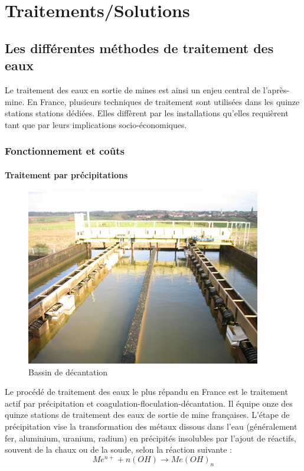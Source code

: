 \documentclass{article}
\begin{document}
\newpage
\section{Traitements/Solutions}
\subsection{Les différentes méthodes de traitement des eaux}
Le traitement des eaux en sortie de mines est ainsi un enjeu central de l’après-mine. En France, plusieurs techniques de traitement sont utilisées dans les quinze stations stations dédiées. Elles diffèrent par les installations qu’elles requièrent tant que par leurs implications socio-économiques.

\subsubsection{Fonctionnement et coûts}
\paragraph{Traitement par précipitations} \hspace{1 em}




\begin{figure}[H]
\centering
\includegraphics[width = 0.5\linewidth]{III_A_1.png}
\caption{Bassin de décantation}
\label{fig:bassin_decantation}
\end{figure}



Le procédé de traitement des eaux le plus répandu en France est le traitement actif par précipitation et coagulation-floculation-décantation. Il équipe onze des quinze stations de traitement des eaux de sortie de mine françaises. 
L’étape de précipitation vise la transformation des métaux dissous dans l’eau (généralement fer, aluminium, uranium, radium) en précipités insolubles par l’ajout de réactifs, souvent de la chaux ou de la soude, selon la réaction suivante :   
$$Me^{n+} + n(OH) \rightarrow Me(OH)_{n}$$
          	
\end{document}
